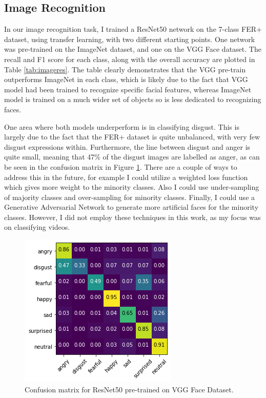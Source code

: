 \documentclass[sigconf]{acmart}
\begin{document}
{\subsection{Image Recognition}


In our image recognition task, I trained a ResNet50 network on the 7-class FER+
dataset, using transfer learning, with two different starting points. One
network was pre-trained on the ImageNet dataset, and one on the VGG Face
dataset. The recall and F1 score for each class, along with the overall
accuracy are plotted in Table \ref{tab:imageres}. The table clearly
demonstrates that the VGG pre-train outperforms ImageNet in each class, which
is likely due to the fact that VGG model had been trained to recognize specific facial
features, whereas ImageNet model is trained on a much wider set of objects so is
less dedicated to recognizing faces.

One area where both models underperform is in classifying disgust. This is largely
due to the fact that the FER+ dataset is quite unbalanced, with very few
disgust expressions within. Furthermore, the line between disgust and anger is
quite small, meaning that 47\% of the disgust images are labelled as
anger,
as can be seen in the confusion matrix in Figure \ref{fig:image-vgg}. There
are a couple of ways to address this in the future, for example I could utilize a
weighted loss function which gives more weight to the minority
classes. Also I could use under-sampling of majority classes and over-sampling
for minority classes. Finally, I could use a Generative
Adversarial Network to generate more artificial faces for the minority
classes. However, I did not employ these techniques in this work, as my focus
was on classifying videos.

\begin{figure}[htbp]
	\includegraphics[width=0.7\linewidth]{images/image-vgg.png}
	\caption{Confusion matrix for ResNet50 pre-trained on VGG Face Dataset.}
  \label{fig:image-vgg}
\end{figure}




}
\end{document}
